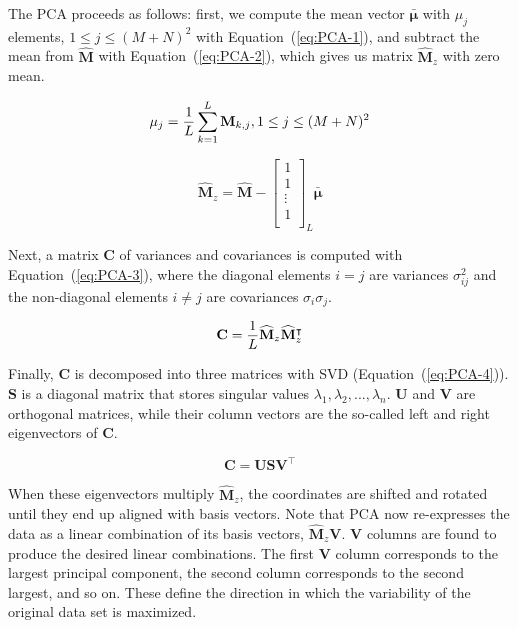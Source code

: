  The PCA proceeds as follows:  first, we compute the mean vector $\mathbf{\bar\mu}$ with $\mu_j$ elements, $1 \leq j \leq (M+N)^2$ with Equation~(\ref{eq:PCA-1}), and subtract the mean from $\mathbf{\widehat M}$ with Equation~(\ref{eq:PCA-2}), which gives us matrix $\mathbf{\widehat M}_z$ with zero mean.

\begin{equation}
\mu_j = {1 \over L} \sum_{k=1}^L \mathbf{M}_{k, j}, 1 \leq j \leq (M+N)^2
\label{eq:PCA-1}
\end{equation}

\begin{equation}
\mathbf{\widehat M}_z = \mathbf{\widehat M} - \begin{bmatrix}
		1 \\
		1 \\
		\vdots \\
		1 \\
	\end{bmatrix}_{L} \mathbf{\bar\mu}
\label{eq:PCA-2}
\end{equation}

Next, a matrix $\mathbf{C}$ of variances and covariances is computed with Equation~(\ref{eq:PCA-3}), where the diagonal elements $i = j$ are variances $\sigma_{ij}^2$ and the non-diagonal elements $i \neq j$ are covariances $\sigma_i\sigma_j$. 

\begin{equation}
\mathbf{C} = {1 \over L} \mathbf{\widehat M}_z \mathbf{\widehat M}_z^\intercal
\label{eq:PCA-3}
\end{equation}

Finally, $\mathbf{C}$ is decomposed into three matrices with SVD (Equation~(\ref{eq:PCA-4})). $\mathbf{S}$ is a diagonal matrix that stores singular values $\lambda_1, \lambda_2, ..., \lambda_n$. $\mathbf{U}$ and $\mathbf{V}$ are orthogonal matrices, while their column vectors are the so-called left and right eigenvectors of $\mathbf{C}$. 

\begin{equation}
\mathbf{C} = \mathbf{USV}^\intercal
\label{eq:PCA-4}
\end{equation}

When these eigenvectors multiply $\mathbf{\widehat M}_z$, the coordinates are shifted and rotated until they end up aligned with basis vectors. Note that PCA now re-expresses the data as a linear combination of its basis vectors, $\mathbf{\widehat M}_z\mathbf{V}$. $\mathbf{V}$ columns are found to produce the desired linear combinations. The first $\mathbf{V}$ column corresponds to the largest principal component, the second column corresponds to the second largest, and so on. These define the direction in which the variability of the original data set is maximized.

